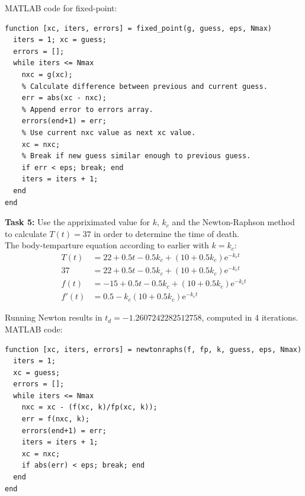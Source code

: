 \documentclass{article}
\begin{document}
  \noindent
  MATLAB code for fixed-point:

  \begin{verbatim}
function [xc, iters, errors] = fixed_point(g, guess, eps, Nmax)
  iters = 1; xc = guess;
  errors = [];
  while iters <= Nmax
    nxc = g(xc);
    % Calculate difference between previous and current guess.
    err = abs(xc - nxc);
    % Append error to errors array.
    errors(end+1) = err;
    % Use current nxc value as next xc value.
    xc = nxc;
    % Break if new guess similar enough to previous guess.
    if err < eps; break; end
    iters = iters + 1;
  end
end
  \end{verbatim}

  \noindent
  \textbf{Task 5:}
  Use the appriximated value for $k$, $k_c$ and the Newton-Raphson method to
  calculate $T(t) = 37$ in order to determine the time of death. \\

  \noindent
  The body-temparture equation according to earlier with $k = k_c$:
  \begin{align*}
    T(t) &= 22 + 0.5t - 0.5k_c + (10 + 0.5k_c)\mathrm{e}^{-k_ct} \\
    37 &= 22 + 0.5t - 0.5k_c + (10 + 0.5k_c)\mathrm{e}^{-k_ct} \\
    f(t) &= -15 + 0.5t - 0.5k_c + (10 + 0.5k_c)\mathrm{e}^{-k_ct} \\
    f'(t) &=  0.5 -k_c(10 + 0.5k_c)\mathrm{e}^{-k_ct}
  \end{align*}

%
%

  \noindent
  Running Newton results in $t_d = -1.2607242282512758$, computed in 4
  iterations. \\

  \noindent
  MATLAB code:
  \begin{verbatim}
function [xc, iters, errors] = newtonraphs(f, fp, k, guess, eps, Nmax)
  iters = 1;
  xc = guess;
  errors = [];
  while iters <= Nmax
    nxc = xc - (f(xc, k)/fp(xc, k));
    err = f(nxc, k);
    errors(end+1) = err;
    iters = iters + 1;
    xc = nxc;
    if abs(err) < eps; break; end
  end
end
\end{verbatim}
\end{document}
